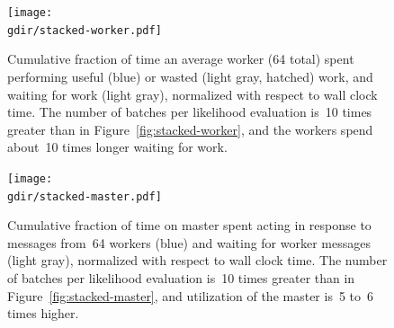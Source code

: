 \documentclass[angelino.tex]{subfiles}
\newcommand{\gdir}{/Users/elaine/Dropbox/nips12-mcmc/consolidate/20140310}
\begin{document}
\begin{figure}[t!]
\begin{center}
\texttt{[image: \\gdir/stacked-worker.pdf]}
\end{center}
\vspace{-0.1in}
\caption{Cumulative fraction of time an average worker (64 total) spent performing
useful (blue) or wasted (light gray, hatched) work, and waiting for work
(light gray), normalized with respect to wall clock time.
The number of batches per likelihood evaluation is~10 times greater than in
Figure~\ref{fig:stacked-worker},
and the workers spend about~10 times longer waiting for work.
}
\label{fig:stacked-worker-wait}
\end{figure}
%
\begin{figure}[t!]
\begin{center}
\texttt{[image: \\gdir/stacked-master.pdf]}
\end{center}
\vspace{-0.1in}
\caption{Cumulative fraction of time on master spent acting in response to
messages from~64 workers (blue) and waiting for worker messages (light gray),
normalized with respect to wall clock time.
The number of batches per likelihood evaluation is~10 times greater than in
Figure~\ref{fig:stacked-master},
and utilization of the master is~5 to~6 times higher.}
\label{fig:stacked-master-work}
\end{figure}
\end{document}

